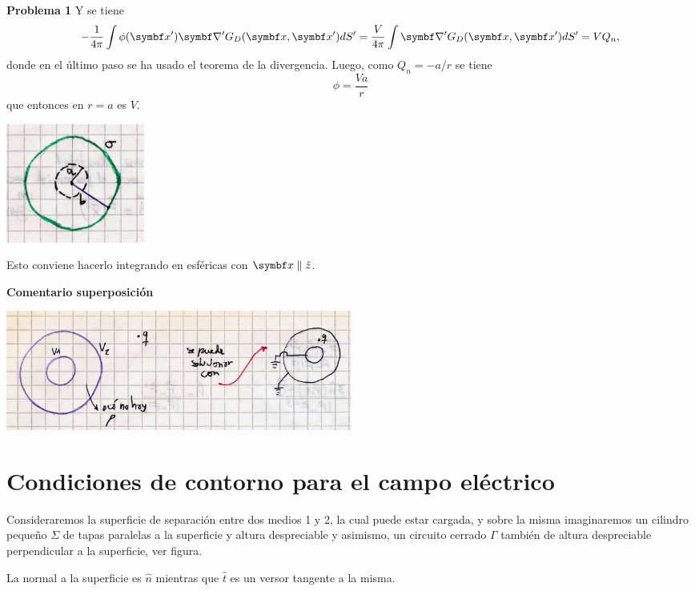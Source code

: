\documentclass[10pt,oneside]{CBFT_book}
\begin{document}
\begin{ejemplo}{\bf Problema 1}
Y se tiene 
\[
	-\frac{ 1 }{ 4\pi } \int \phi(\vbx') \Nabla' G_D(\vbx,\vbx') dS' =
	\frac{ V }{ 4 \pi } \int \Nabla' G_D(\vbx,\vbx') dS' = V Q_n,
\]
donde en el último paso se ha usado el teorema de la divergencia. Luego, como
$Q_n = -a/r$ se tiene 
\[
	\phi = \frac{Va}{r}
\]
que entonces en $r=a$ es $V$.

\includegraphics[width=0.2\textwidth]{images/fig_ft1_g1_p1_B.jpg} 

Esto conviene hacerlo integrando en esféricas con $\vbx \parallel \hat{z}$.

\end{ejemplo}

\begin{ejemplo}{\bf Comentario superposición}
 
\includegraphics[width=0.5\textwidth]{images/fig_ft1_comentario_superposicion.jpg} 
 
\end{ejemplo}

\section{Condiciones de contorno para el campo eléctrico}

Consideraremos la superficie de separación entre dos medios 1 y 2, la cual puede estar cargada, y sobre
la misma imaginaremos un cilindro pequeño $\Sigma$ de tapas paralelas a la superficie y altura despreciable y 
asimismo, un circuito cerrado $\Gamma$ también de altura despreciable perpendicular a la superficie, ver figura.

La normal a la superficie es $\hat{n}$ mientras que $\hat{t}$ es un versor tangente a la misma.
\end{document}
